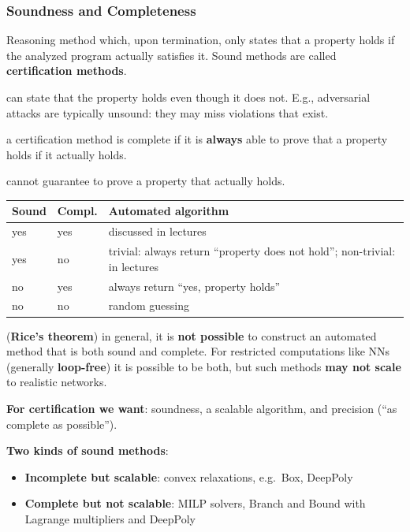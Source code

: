 \subsubsection{Soundness and Completeness}
 Reasoning method which, upon termination, only states that a property holds if the analyzed program actually satisfies it. 
Sound methods are called \textcolor{mygreen}{\textbf{certification methods}}.

 can state that the property holds even though it does not. E.g., adversarial attacks
are typically unsound: they may miss violations that exist.

 a certification method is complete if it is \textbf{always} able to prove that a
property holds if it actually holds.

 cannot guarantee to prove a property that actually holds.

{\footnotesize
\setlength{\tabcolsep}{3pt}
\renewcommand{\arraystretch}{1.15}
\noindent\begin{tabular}{@{}ll>{\raggedright\arraybackslash}p{}@{}}
\hline
\textbf{Sound} & \textbf{Compl.} & \textbf{Automated algorithm} \\
\hline
yes & yes & discussed in lectures \\
yes & no & trivial: always return ``property does not hold''; non-trivial: in lectures \\
no & yes & always return ``yes, property holds'' \\
no & no & random guessing \\
\hline
\end{tabular}\par}

\theorem{} (\textbf{Rice's theorem}) in general, it is \textbf{not possible} to construct an automated method
that is both sound and complete. For restricted computations like NNs (generally \textbf{loop-free}) it is
possible to be both, but such methods \textbf{may not scale} to realistic networks.

\textbf{For certification we want}: soundness, a scalable algorithm, and precision (``as complete as possible'').

\textbf{Two kinds of sound methods}:
\begin{itemize}
  \item \textbf{Incomplete but scalable}: convex relaxations, e.g.\ Box, DeepPoly
  \item \textbf{Complete but not scalable}: MILP solvers, Branch and Bound with Lagrange multipliers and DeepPoly
\end{itemize}

